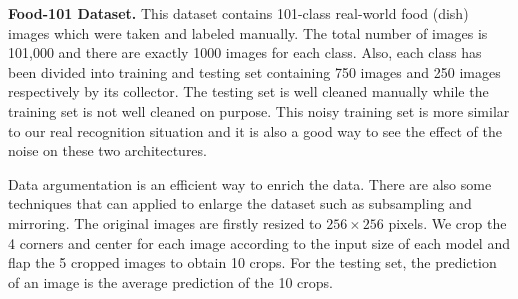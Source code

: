 \textbf{Food-101 Dataset.}
This dataset contains 101-class real-world food (dish) images which were taken and labeled manually. The total number of images is 101,000 and there are exactly 1000 images for each class. Also, each class has been divided into training and testing set containing 750 images and 250 images respectively by its collector. The testing set is well cleaned manually while the training set is not well cleaned on purpose. This noisy training set is more similar to our real recognition situation and it is also a good way to see the effect of the noise on these two architectures.

Data argumentation is an efficient way to enrich the data. There are also some techniques that can applied to enlarge the dataset such as subsampling and mirroring. The original images are firstly resized to $256\times 256$ pixels. We crop the 4 corners and center for each image according to the input size of each model and flap the 5 cropped images to obtain 10 crops. For the testing set, the prediction of an image is the average prediction of the 10 crops.

